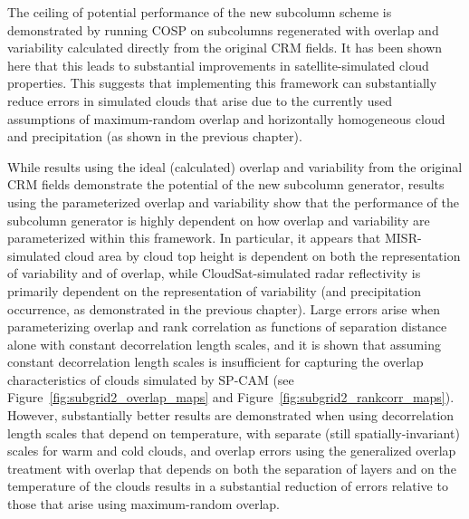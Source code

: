 The ceiling of potential performance of the new subcolumn scheme is
demonstrated by running COSP on subcolumns regenerated with overlap and
variability calculated directly from the original CRM fields. It has
been shown here that this leads to substantial improvements in
satellite-simulated cloud properties. This suggests that implementing
this framework can substantially reduce errors in simulated clouds that
arise due to the currently used assumptions of maximum-random overlap
and horizontally homogeneous cloud and precipitation (as shown in the
previous chapter).

While results using the ideal (calculated) overlap and variability from
the original CRM fields demonstrate the potential of the new subcolumn
generator, results using the parameterized overlap and variability show
that the performance of the subcolumn generator is highly dependent on
how overlap and variability are parameterized within this framework. In
particular, it appears that MISR-simulated cloud area by cloud top
height is dependent on both the representation of variability and of
overlap, while CloudSat-simulated radar reflectivity is primarily
dependent on the representation of variability (and precipitation
occurrence, as demonstrated in the previous chapter). Large errors arise
when parameterizing overlap and rank correlation as functions of
separation distance alone with constant decorrelation length scales, and
it is shown that assuming constant decorrelation length scales is
insufficient for capturing the overlap characteristics of clouds
simulated by SP-CAM (see Figure~\ref{fig:subgrid2_overlap_maps} and
Figure~\ref{fig:subgrid2_rankcorr_maps}). However, substantially better
results are demonstrated when using decorrelation length scales that
depend on temperature, with separate (still spatially-invariant) scales
for warm and cold clouds, and overlap errors using the generalized
overlap treatment with overlap that depends on both the separation of
layers and on the temperature of the clouds results in a substantial
reduction of errors relative to those that arise using maximum-random
overlap.

